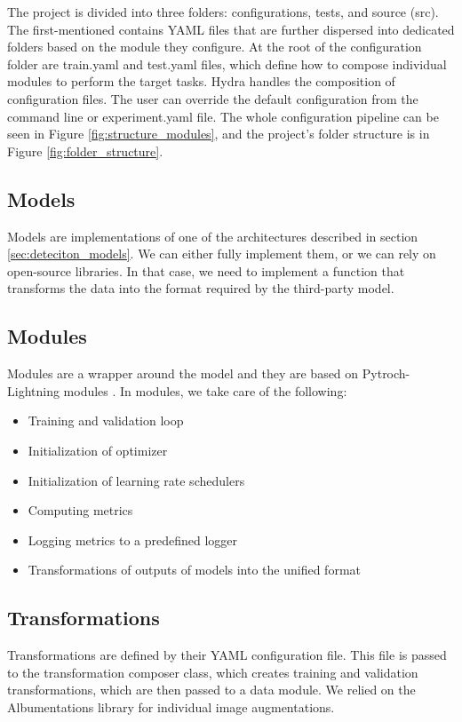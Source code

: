 The project is divided into three folders: configurations, tests, and source (src). The first-mentioned contains YAML files that are further dispersed into dedicated folders based on the module they configure. At the root of the configuration folder are train.yaml and test.yaml files, which define how to compose individual modules to perform the target tasks. Hydra \cite{Yadan2019Hydra} handles the composition of configuration files. The user can override the default configuration from the command line or experiment.yaml file. The whole configuration pipeline can be seen in Figure \ref{fig:structure_modules}, and the project's folder structure is in Figure \ref{fig:folder_structure}.



\subsection{Models}
Models are implementations of one of the architectures described in section \ref{sec:deteciton_models}. We can either fully implement them, or we can rely on open-source libraries. In that case, we need to implement a function that transforms the data into the format required by the third-party model.

\subsection{Modules}
Modules are a wrapper around the model and they are based on Pytroch-Lightning modules \cite{falcon2019pytorch}. In modules, we take care of the following:
\begin{itemize}
    \item Training and validation loop
    \item Initialization of optimizer
    \item Initialization of learning rate schedulers
    \item Computing metrics
    \item Logging metrics to a predefined logger
    \item Transformations of outputs of models into the unified format
\end{itemize}


\subsection{Transformations}
Transformations are defined by their YAML configuration file. This file is passed to the transformation composer class, which creates training and validation transformations, which are then passed to a data module. We relied on the Albumentations library for individual image augmentations.

